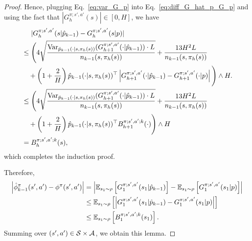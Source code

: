 \begin{proof}
	Hence, plugging Eq.~\eqref{eq:var_G_p} into Eq.~\eqref{eq:diff_G_hat_p_G_p} and using the fact that $|G^{\pi;s',a'}_h(s)| \in [0,H]$, we have
	\begin{align*}
		&\quad\ |G^{\pi;s',a'}_h(s|\hat{p}_{k-1}) - G^{\pi;s',a'}_h(s|p)|
		\\
		&\leq \Bigg(4\sqrt{\frac{ \textup{Var}_{\hat{p}_{k-1}(\cdot|s,\pi_h(s))}(G^{\pi;s',a'}_{h+1}(\cdot|\hat{p}_{k-1})) \cdot L}{{n_{k-1}(s,\pi_h(s))}}}  + \frac{13H^2L}{n_{k-1}(s,\pi_h(s))}
		\\& \quad + \left( 1+\frac{2}{H} \right) \hat{p}_{k-1}(\cdot|s,\pi_h(s))^\top \left| G^{\pi;s',a'}_{h+1}(\cdot|\hat{p}_{k-1}) - G^{\pi;s',a'}_{h+1}(\cdot|p)  \right| \Bigg) \wedge H  .
		\\
		&\leq \Bigg(4\sqrt{\frac{ \textup{Var}_{\hat{p}_{k-1}(\cdot|s,\pi_h(s))}(G^{\pi;s',a'}_{h+1}(\cdot|\hat{p}_{k-1})) \cdot L}{{n_{k-1}(s,\pi_h(s))}}}  + \frac{13H^2L}{n_{k-1}(s,\pi_h(s))}
		\\& \quad + \left( 1+\frac{2}{H} \right) \hat{p}_{k-1}(\cdot|s,\pi_h(s))^\top B^{\pi;s',a';k}_{h+1}(\cdot) \Bigg) \wedge H 
		\\
		&= B^{\pi;s',a';k}_{h}(s) ,
	\end{align*}
	which completes the induction proof.
	
	
	Therefore, 
	\begin{align*}
		\Big|\hat{\phi}_{k-1}^{\pi}(s',a')-\phi^{\pi}(s',a')\Big| 
		&= \left|  \mathbb{E}_{s_1 \sim \rho}\left[ G^{\pi;s',a'}_1(s_1|\hat{p}_{k-1}) \right] - \mathbb{E}_{s_1 \sim \rho}\left[ G^{\pi;s',a'}_1(s_1|p) \right]  \right|
		\\
		&\leq \mathbb{E}_{s_1 \sim \rho}\left[  \left|  G^{\pi;s',a'}_1(s_1|\hat{p}_{k-1}) - G^{\pi;s',a'}_1(s_1|p)  \right|  \right]
		\\
		&\leq \mathbb{E}_{s_1 \sim \rho}\left[ B^{\pi;s',a';k}_1(s_1) \right] .
	\end{align*}
	Summing over $(s',a') \in \mathcal{S} \times \mathcal{A}$, we obtain this lemma.
\end{proof}

